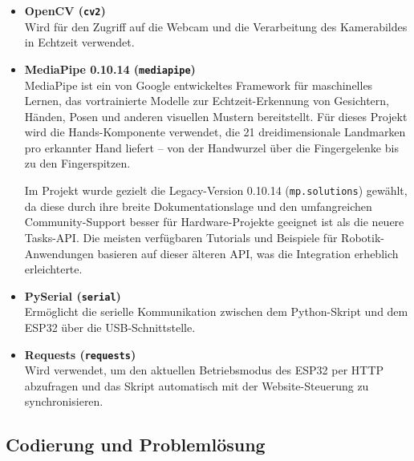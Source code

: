 \documentclass[12pt,a4paper]{article}
\begin{document}
\vspace{0.5em}
\begin{itemize}[itemsep=4pt]
    \item \textbf{OpenCV (\texttt{cv2})} \\
    Wird für den Zugriff auf die Webcam und die Verarbeitung des Kamerabildes 
    in Echtzeit verwendet.

    \item \textbf{MediaPipe 0.10.14 (\texttt{mediapipe})} \\
    MediaPipe ist ein von Google entwickeltes Framework für maschinelles Lernen, 
    das vortrainierte Modelle zur Echtzeit-Erkennung von Gesichtern, Händen, Posen 
    und anderen visuellen Mustern bereitstellt. Für dieses Projekt wird die 
    Hands-Komponente verwendet, die 21 dreidimensionale Landmarken pro erkannter 
    Hand liefert -- von der Handwurzel über die Fingergelenke bis zu den Fingerspitzen.
    
    Im Projekt wurde gezielt die Legacy-Version 0.10.14 (\texttt{mp.solutions}) gewählt, 
    da diese durch ihre breite Dokumentationslage und den umfangreichen Community-Support 
    besser für Hardware-Projekte geeignet ist als die neuere Tasks-API. Die meisten 
    verfügbaren Tutorials und Beispiele für Robotik-Anwendungen basieren auf dieser 
    älteren API, was die Integration erheblich erleichterte.

    \item \textbf{PySerial (\texttt{serial})} \\
    Ermöglicht die serielle Kommunikation zwischen dem Python-Skript und dem 
    ESP32 über die USB-Schnittstelle.

    \item \textbf{Requests (\texttt{requests})} \\
    Wird verwendet, um den aktuellen Betriebsmodus des ESP32 per HTTP abzufragen 
    und das Skript automatisch mit der Website-Steuerung zu synchronisieren.
\end{itemize}

\vspace{0.5em}



\subsection{Codierung und Problemlösung}
\end{document}

